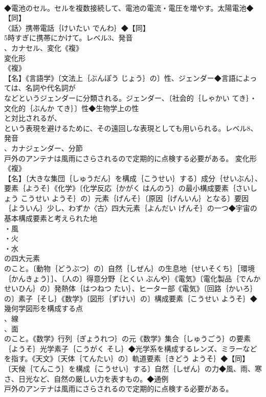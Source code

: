 \documentclass[8pt]{extreport}
\begin{document}
\begin{CJK}{UTF8}{min}
\\	◆電池のセル。セルを複数接続して、電池の電流・電圧を増やす。太陽電池◆【同】
\\	〈話〉携帯電話｛けいたい でんわ｝◆【同】
\\	5時すぎに携帯にかけて。レベル3、発音
\\	、カナセル、変化《複》
\\	変化形 
\\	《複》
\\	【名】《言語学》〔文法上｛ぶんぽう じょう｝の〕性、ジェンダー◆言語によっては、名詞や代名詞が
\\	などというジェンダーに分類される。ジェンダー、〔社会的｛しゃかい てき｝・文化的｛ぶんか てき｝〕性◆生物学上の性
\\	と対比されるが、
\\	という表現を避けるために、その遠回しな表現としても用いられる。レベル8、発音
\\	、カナジェンダー、分節
\\	戸外のアンテナは風雨にさらされるので定期的に点検する必要がある。	変化形 
\\	《複》
\\	【名】〔大きな集団｛しゅうだん｝を構成｛こうせい｝する〕成分｛せいぶん｝、要素｛ようそ｝《化学》〔化学反応｛かがく はんのう｝の最小構成要素｛さいしょう こうせい ようそ｝の〕元素｛げんそ｝〔原因｛げんいん｝となる〕要因｛よういん｝少し、わずか〈古〉四大元素｛よんだい げんそ｝の一つ◆宇宙の基本構成要素と考えられた地
\\	・風
\\	・火
\\	・水
\\	の四大元素
\\	のこと。〔動物｛どうぶつ｝の〕自然｛しぜん｝の生息地｛せいそくち｝［環境｛かんきょう｝］、〔人の〕得意分野｛とくい ぶんや｝《電気》〔電化製品｛でんか せいひん｝の〕発熱体｛はつねつ たい｝、ヒーター部《電気》〔回路｛かいろ｝の〕素子｛そし｝《数学》〔図形｛ずけい｝の〕構成要素｛こうせい ようそ｝◆幾何学図形を構成する点
\\	、線
\\	、面
\\	のこと。《数学》行列｛ぎょうれつ｝の元《数学》集合｛しゅうごう｝の要素｛ようそ｝光学素子｛こうがく そし｝◆光学系を構成するレンズ、ミラーなどを指す。《天文》〔天体｛てんたい｝の〕軌道要素｛きどう ようそ｝◆【同】
\\	〔天候｛てんこう｝を構成｛こうせい｝する〕自然｛しぜん｝の力◆風、雨、寒さ、日光など、自然の厳しい力を表すもの。◆通例
\\	戸外のアンテナは風雨にさらされるので定期的に点検する必要がある。

\end{CJK}
\end{document}
